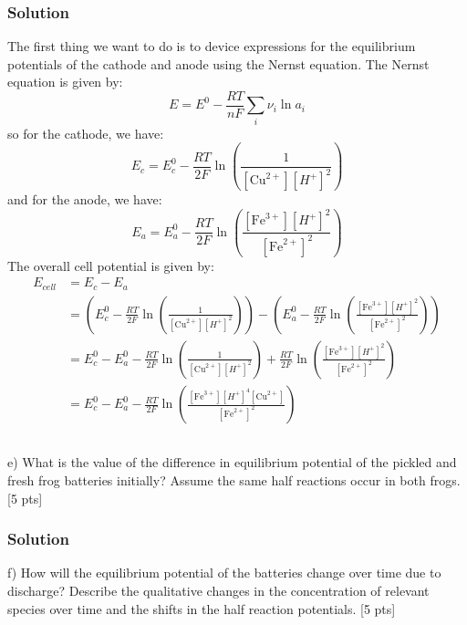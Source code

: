 \documentclass[12pt]{article}
\begin{document}
\subsubsection{Solution}
The first thing we want to do is to device expressions for the equilibrium potentials of the cathode and anode using the Nernst equation. The Nernst equation is given by:
\begin{equation}
E = E^0 - \frac{RT}{nF} \sum_i \nu_i \ln a_i
\end{equation}
so for the cathode, we have:
\begin{equation}
E_c = E_c^0 - \frac{RT}{2F} \ln \left( \frac{1}{[\mathrm{Cu}^{2+}][H^+]^2} \right)
\end{equation}
and for the anode, we have:
\begin{equation}
E_a = E_a^0 - \frac{RT}{2F} \ln \left( \frac{[\mathrm{Fe}^{3+}][H^+]^2}{[\mathrm{Fe}^{2+}]^2} \right)
\end{equation}
The overall cell potential is given by:
\begin{align}
E_{cell} &= E_c - E_a \\
&= \left( E_c^0 - \frac{RT}{2F} \ln \left( \frac{1}{[\mathrm{Cu}^{2+}][H^+]^2} \right) \right) - \left( E_a^0 - \frac{RT}{2F} \ln \left( \frac{[\mathrm{Fe}^{3+}][H^+]^2}{[\mathrm{Fe}^{2+}]^2} \right) \right) \\
&= E_c^0 - E_a^0 - \frac{RT}{2F} \ln \left( \frac{1}{[\mathrm{Cu}^{2+}][H^+]^2} \right) + \frac{RT}{2F} \ln \left( \frac{[\mathrm{Fe}^{3+}][H^+]^2}{[\mathrm{Fe}^{2+}]^2} \right) \\
&= E_c^0 - E_a^0 - \frac{RT}{2F} \ln \left( \frac{[\mathrm{Fe}^{3+}][H^+]^4[\mathrm{Cu}^{2+}]}{[\mathrm{Fe}^{2+}]^2} \right)
\end{align}
\subsection{}
e) What is the value of the difference in equilibrium potential of the pickled and fresh frog batteries initially? Assume the same half reactions occur in both frogs. [5 pts]\\[0pt]
\subsubsection{Solution}

f) How will the equilibrium potential of the batteries change over time due to discharge? Describe the qualitative changes in the concentration of relevant species over time and the shifts in the half reaction potentials. [5 pts]
\end{document}
